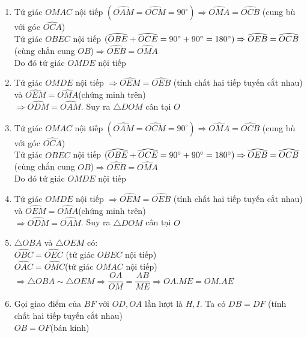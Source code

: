 \begin{ex}
{\begin{center}
\begin{tikzpicture}
    		\end{tikzpicture}
    	\end{center}
    	\begin{enumerate}
    	\item Tứ giác $OMAC$ nội tiếp $(\widehat{OAM}=\widehat{OCM}=90^\circ)\Rightarrow \widehat{OMA}=\widehat{OCB}$ (cung bù với góc $\widehat{OCA}$)\\
    		Tứ giác $OBEC$ nội tiếp $(\widehat{OBE}+\widehat{OCE}=90^\circ+90^\circ=180^\circ)\\ \Rightarrow \widehat{OEB}=\widehat{OCB}$ (cùng chắn cung $OB$)$\Rightarrow \widehat{OEB}=\widehat{OMA}$\\
    		Do đó tứ giác $OMDE$ nội tiếp
    		\item Tứ giác $OMDE$ nội tiếp $\Rightarrow \widehat{OEM}=\widehat{OEB}$ (tính chất hai tiếp tuyến cắt nhau) và $\widehat{OEM}=\widehat{OMA}$(chứng minh trên)\\
    		$\Rightarrow \widehat{ODM}=\widehat{OAM}$. Suy ra $\triangle DOM$ cân tại $O$
    		\item Tứ giác $OMAC$ nội tiếp $(\widehat{OAM}=\widehat{OCM}=90^\circ)\Rightarrow \widehat{OMA}=\widehat{OCB}$ (cung bù với góc $\widehat{OCA}$)\\
    	Tứ giác $OBEC$ nội tiếp $(\widehat{OBE}+\widehat{OCE}=90^\circ+90^\circ=180^\circ)\\ \Rightarrow \widehat{OEB}=\widehat{OCB}$ (cùng chắn cung $OB$)$\Rightarrow \widehat{OEB}=\widehat{OMA}$\\
    	Do đó tứ giác $OMDE$ nội tiếp
    	\item Tứ giác $OMDE$ nội tiếp $\Rightarrow \widehat{OEM}=\widehat{OEB}$ (tính chất hai tiếp tuyến cắt nhau) và $\widehat{OEM}=\widehat{OMA}$(chứng minh trên)\\
    	$\Rightarrow \widehat{ODM}=\widehat{OAM}$. Suy ra $\triangle DOM$ cân tại $O$
    	\item $\triangle OBA$ và $\triangle OEM$ có: \\
    	$\widehat{OBC}=\widehat{OEC}$ (tứ giác $OBEC$ nội tiếp)\\
    	$\widehat{OAC}=\widehat{OMC}$(tứ giác $OMAC$ nội tiếp)\\
    	$\Rightarrow \triangle OBA \sim \triangle OEM\Rightarrow \dfrac{OA}{OM}=\dfrac{AB}{ME}\Rightarrow OA.ME=OM.AE$
    	\item Gọi giao điểm của $BF$ với $OD,OA$ lần lượt là $H,I$. Ta có $DB=DF$ (tính chất hai tiếp tuyến cắt nhau)\\
    	$OB=OF$(bán kính)\\

\end{enumerate}}
\end{ex}

